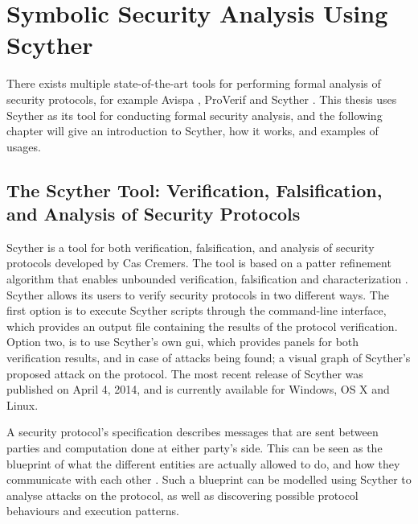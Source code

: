 \chapter{Symbolic Security Analysis Using Scyther}
\label{chp:scyther} 


There exists multiple state-of-the-art tools for performing formal analysis of security protocols, for example Avispa \cite{avispa}, ProVerif \cite{proverif} and Scyther \cite{scyther}. This thesis uses Scyther as its tool for conducting formal security analysis, and the following chapter will give an introduction to Scyther, how it works, and examples of usages.


\section{The Scyther Tool: Verification, Falsification, and Analysis of Security Protocols}

Scyther is a tool for both verification, falsification, and analysis of security protocols developed by Cas Cremers. The tool is based on a patter refinement algorithm that enables unbounded verification, falsification and characterization \cite{cremers2008scyther}. Scyther allows its users to verify security protocols in two different ways. The first option is to execute Scyther scripts through the command-line interface, which provides an output file containing the results of the protocol verification. Option two, is to use Scyther's own \gls{gui}, which provides panels for both verification results, and in case of attacks being found; a visual graph of Scyther's proposed attack on the protocol. The most recent release of Scyther was published on April 4, 2014, and is currently available for Windows, OS X and Linux.

A security protocol's specification describes messages that are sent between parties and computation done at either party's side. This can be seen as the blueprint of what the different entities are actually allowed to do, and how they communicate with each other \cite{cremers2006scyther}. Such a blueprint can be modelled using Scyther to analyse attacks on the protocol, as well as discovering possible protocol behaviours and execution patterns.








